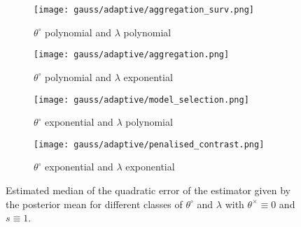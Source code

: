 \begin{figure}
\centering
\begin{subfigure}{.5\textwidth}
  \centering
  \texttt{[image: gauss/adaptive/aggregation\_surv.png]}
  \caption{$\theta^{\circ}$ polynomial and $\lambda$ polynomial}
  \label{fig3:sub1}
\end{subfigure}%
\begin{subfigure}{.5\textwidth}
  \centering
  \texttt{[image: gauss/adaptive/aggregation.png]}
  \caption{$\theta^{\circ}$ polynomial and $\lambda$ exponential}
  \label{fig3:sub2}
\end{subfigure}
\begin{subfigure}{.5\textwidth}
  \centering
  \texttt{[image: gauss/adaptive/model\_selection.png]}
  \caption{$\theta^{\circ}$ exponential and $\lambda$ polynomial}
  \label{fig3:sub3}
\end{subfigure}%
\begin{subfigure}{.5\textwidth}
  \centering
  \texttt{[image: gauss/adaptive/penalised\_contrast.png]}
  \caption{$\theta^{\circ}$ exponential and $\lambda$ exponential}
  \label{fig3:sub4}
\end{subfigure}
\caption{Estimated median of the quadratic error of the estimator given by the posterior mean for different classes of $\theta^{\circ}$ and $\lambda$ with $\theta^{\times} \equiv 0$ and $s \equiv 1$.}
\label{EQM}
\end{figure}

